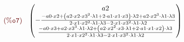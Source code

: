 \noindent
$\displaystyle
\parbox{8ex}{$\color{labelcolor}\mathrm{\tt (\%o7) }\quad $}
\begin{pmatrix}{a2}\cr -\frac{-{a0}\cdot {x2}+\left( {a2}\cdot {x2}\cdot {{{x3}}^{2}}\cdot {\lambda1}+2\cdot {a1}\cdot {x1}\cdot {x3}\right) \cdot {\lambda2}+{a2}\cdot {{{x2}}^{3}}\cdot {\lambda1}\cdot {\lambda3}}{2\cdot {x1}\cdot {{{x2}}^{2}}\cdot {\lambda1}\cdot {\lambda3}-2\cdot {x1}\cdot {{{x3}}^{2}}\cdot {\lambda1}\cdot {\lambda2}}\cr \frac{-{a0}\cdot {x3}+{a2}\cdot {{{x3}}^{3}}\cdot {\lambda1}\cdot {\lambda2}+\left( {a2}\cdot {{{x2}}^{2}}\cdot {x3}\cdot {\lambda1}+2\cdot {a1}\cdot {x1}\cdot {x2}\right) \cdot {\lambda3}}{2\cdot {x1}\cdot {{{x2}}^{2}}\cdot {\lambda1}\cdot {\lambda3}-2\cdot {x1}\cdot {{{x3}}^{2}}\cdot {\lambda1}\cdot {\lambda2}}\end{pmatrix}\mbox{}
$
